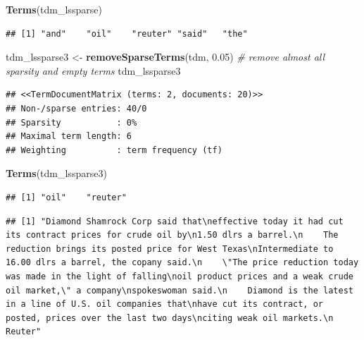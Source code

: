 \documentclass[]{book}
\newenvironment{Shaded}{\begin{snugshade}}{\end{snugshade}}
\newcommand{\KeywordTok}[1]{\textcolor[rgb]{0.13,0.29,0.53}{\textbf{{#1}}}}
\newcommand{\DecValTok}[1]{\textcolor[rgb]{0.00,0.00,0.81}{{#1}}}
\newcommand{\FloatTok}[1]{\textcolor[rgb]{0.00,0.00,0.81}{{#1}}}
\newcommand{\StringTok}[1]{\textcolor[rgb]{0.31,0.60,0.02}{{#1}}}
\newcommand{\CommentTok}[1]{\textcolor[rgb]{0.56,0.35,0.01}{\textit{{#1}}}}
\newcommand{\NormalTok}[1]{{#1}}
\begin{document}
\begin{Shaded}
\begin{Highlighting}[]
\KeywordTok{Terms}\NormalTok{(tdm_lssparse)}
\end{Highlighting}
\end{Shaded}

\begin{verbatim}
## [1] "and"    "oil"    "reuter" "said"   "the"
\end{verbatim}

\begin{Shaded}
\begin{Highlighting}[]
\NormalTok{tdm_lssparse3 <-}\StringTok{ }\KeywordTok{removeSparseTerms}\NormalTok{(tdm, }\FloatTok{0.05}\NormalTok{) }\CommentTok{# remove almost all sparsity and empty terms}
\NormalTok{tdm_lssparse3}
\end{Highlighting}
\end{Shaded}

\begin{verbatim}
## <<TermDocumentMatrix (terms: 2, documents: 20)>>
## Non-/sparse entries: 40/0
## Sparsity           : 0%
## Maximal term length: 6
## Weighting          : term frequency (tf)
\end{verbatim}

\begin{Shaded}
\begin{Highlighting}[]
\KeywordTok{Terms}\NormalTok{(tdm_lssparse3)}
\end{Highlighting}
\end{Shaded}

\begin{verbatim}
## [1] "oil"    "reuter"
\end{verbatim}

\begin{Shaded}
\end{Shaded}

\begin{verbatim}
## [1] "Diamond Shamrock Corp said that\neffective today it had cut its contract prices for crude oil by\n1.50 dlrs a barrel.\n    The reduction brings its posted price for West Texas\nIntermediate to 16.00 dlrs a barrel, the copany said.\n    \"The price reduction today was made in the light of falling\noil product prices and a weak crude oil market,\" a company\nspokeswoman said.\n    Diamond is the latest in a line of U.S. oil companies that\nhave cut its contract, or posted, prices over the last two days\nciting weak oil markets.\n Reuter"
\end{verbatim}
\end{document}
